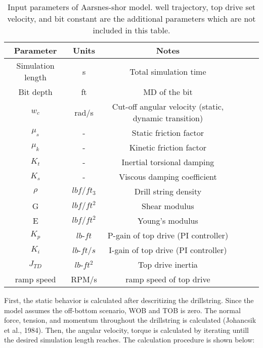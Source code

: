 \begin{table}[!hbt]
\centering
\begin{tabular}{|c|c|c|c|c|c|}
\hline
Parameter & Units & Notes\\                                                              
\hline
Simulation length & s & Total simulation time \\                                                  
\hline
Bit depth & ft & MD of the bit \\                                                   
\hline
$w_c$ & rad/s & Cut-off angular velocity (static, dynamic transition)\\                                                              
\hline
$\mu_s$ & -& Static friction factor\\
\hline
$\mu_k$ & - & Kinetic friction factor \\ 
\hline
$K_t$ &- & Inertial torsional damping \\                                                  
\hline
$K_s$ &- & Viscous damping coefficient \\                                                   
\hline
$\rho$ & $lbf/ft_3$ & Drill string density \\                                                       
\hline
G & $lbf/ft^2$ & Shear modulus   \\                                                         
\hline
E & $lbf/ft^2$ & Young's modulus \\                                                              
\hline
$K_p$ & $lb$-$ft$ & P-gain of top drive (PI controller) \\
\hline
$K_i$ & $lb$-$ft/s$ &I-gain of top drive (PI controller)\\ 
\hline
$J_{TD}$ & $lb$-$ft^2$ & Top drive inertia \\
\hline
ramp speed & RPM/s & ramp speed of top drive\\
\hline
\end{tabular}
\caption[Input parameters of Aarsnes-Shor model]{Input parameters of Aarsnes-shor model. well trajectory, top drive set velocity, and bit constant are the additional parameters which are not included in this table.}\label{AS_inptut_params}
\end{table}

First, the static behavior is calculated after descritizing the drillstring. Since the model assumes the off-bottom scenario, WOB and TOB is zero. The normal force, tension, and momentum throughout the drillstring is calculated (Johancsik et al., 1984). Then, the angular velocity, torque is calculated by iterating untill the desired simulation length reaches. The calculation procedure is shown below: 

